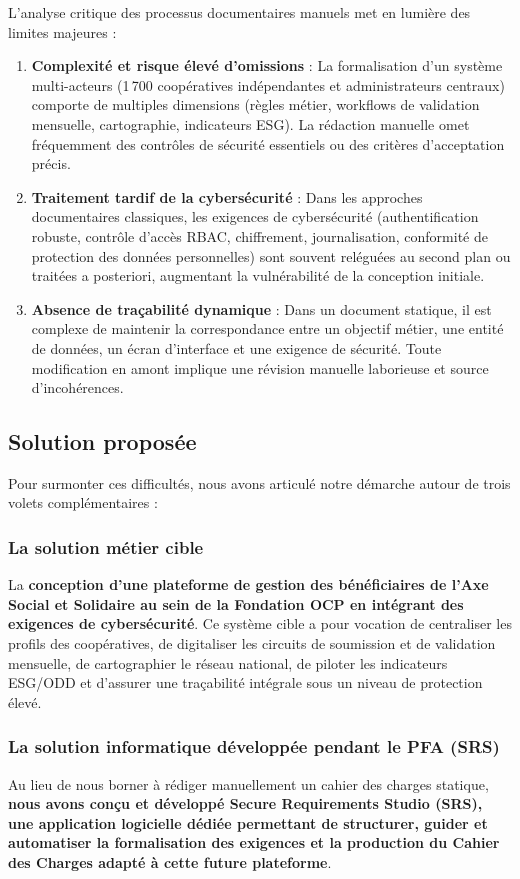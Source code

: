 L'analyse critique des processus documentaires manuels met en lumière des limites majeures :
\begin{enumerate}
    \item \textbf{Complexité et risque élevé d'omissions} : La formalisation d'un système multi-acteurs (1\,700 coopératives indépendantes et administrateurs centraux) comporte de multiples dimensions (règles métier, workflows de validation mensuelle, cartographie, indicateurs ESG). La rédaction manuelle omet fréquemment des contrôles de sécurité essentiels ou des critères d'acceptation précis.
    \item \textbf{Traitement tardif de la cybersécurité} : Dans les approches documentaires classiques, les exigences de cybersécurité (authentification robuste, contrôle d'accès RBAC, chiffrement, journalisation, conformité de protection des données personnelles) sont souvent reléguées au second plan ou traitées a posteriori, augmentant la vulnérabilité de la conception initiale.
    \item \textbf{Absence de traçabilité dynamique} : Dans un document statique, il est complexe de maintenir la correspondance entre un objectif métier, une entité de données, un écran d'interface et une exigence de sécurité. Toute modification en amont implique une révision manuelle laborieuse et source d'incohérences.
\end{enumerate}

\subsection{Solution proposée}

Pour surmonter ces difficultés, nous avons articulé notre démarche autour de trois volets complémentaires :

\subsubsection{La solution métier cible}
La \textbf{conception d'une plateforme de gestion des bénéficiaires de l'Axe Social et Solidaire au sein de la Fondation OCP en intégrant des exigences de cybersécurité}. Ce système cible a pour vocation de centraliser les profils des coopératives, de digitaliser les circuits de soumission et de validation mensuelle, de cartographier le réseau national, de piloter les indicateurs ESG/ODD et d'assurer une traçabilité intégrale sous un niveau de protection élevé.

\subsubsection{La solution informatique développée pendant le PFA (SRS)}
Au lieu de nous borner à rédiger manuellement un cahier des charges statique, \textbf{nous avons conçu et développé Secure Requirements Studio (SRS), une application logicielle dédiée permettant de structurer, guider et automatiser la formalisation des exigences et la production du Cahier des Charges adapté à cette future plateforme}.

